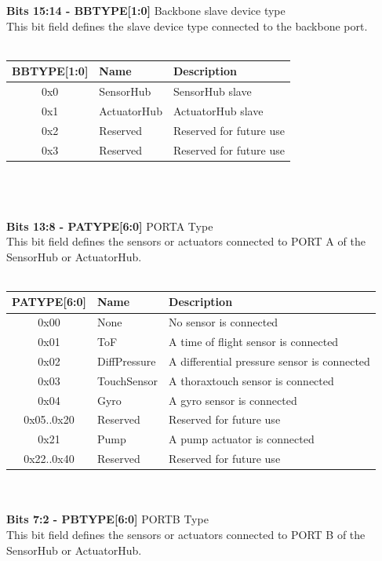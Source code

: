 \documentclass{article}
\begin{document}
\textbf{Bits 15:14 - BBTYPE[1:0]} Backbone slave device type\\
This bit field defines the slave device type connected to the backbone port.\\\\
\begin{tabular}{|c|l|l|}
\hline
   BBTYPE[1:0]  &  Name & Description\\ \hline
    0x0 &  SensorHub & SensorHub slave\\ \hline
    0x1 & ActuatorHub & ActuatorHub slave\\ \hline
    0x2 & Reserved & Reserved for future use\\ \hline
    0x3 & Reserved & Reserved for future use\\
\hline
\end{tabular}\\\\\\
\textbf{Bits 13:8 - PATYPE[6:0]} PORTA Type\\
This bit field defines the sensors or actuators connected to PORT A of the SensorHub or
ActuatorHub.\\\\
\begin{tabular}{|c|l|l|}
    \hline
    PATYPE[6:0] & Name & Description \\ \hline
    0x00 & None & No sensor is connected\\ \hline
    0x01 & ToF & A time of flight sensor is connected\\ \hline
    0x02 & DiffPressure & A differential pressure sensor is connected\\ \hline
    0x03 & TouchSensor & A thoraxtouch sensor is connected\\ \hline
    0x04 & Gyro & A gyro sensor is connected\\ \hline
    0x05..0x20 & Reserved & Reserved for future use\\ \hline
    0x21 & Pump & A pump actuator is connected\\ \hline
    0x22..0x40 & Reserved & Reserved for future use \\ \hline
\end{tabular}
\\\\
\textbf{Bits 7:2 - PBTYPE[6:0]} PORTB Type\\
This bit field defines the sensors or actuators connected to PORT B of the SensorHub or
ActuatorHub.\\\\
\end{document}
